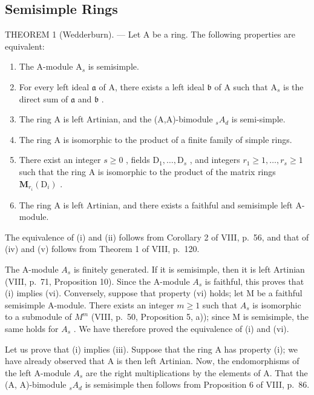 \subsection{Semisimple Rings}

THEOREM 1 (Wedderburn). --- Let A be a ring. The following properties are equivalent:

\begin{enumerate}
\def\labelenumi{(\roman{enumi})}
\item
  The A-module \(\mathrm{A}_s\) is semisimple.
\item
  For every left ideal \(\mathfrak{a}\) of A, there exists a left ideal \(\mathfrak{b}\) of A such that \(\mathrm{A}_s\) is the direct sum of \(\mathfrak{a}\) and \(\mathfrak{b}\) .
\item
  The ring A is left Artinian, and the (A,A)-bimodule \(_{s}A_{d}\) is semi-simple.
\item
  The ring A is isomorphic to the product of a finite family of simple rings.
\item
  There exist an integer \(s \geqslant 0\) , fields \(\mathrm{D}_1, \ldots, \mathrm{D}_s\) , and integers \(r_1 \geqslant 1, \ldots, r_s \geqslant 1\) such that the ring A is isomorphic to the product of the matrix rings \(\mathbf{M}_{r_i}(\mathrm{D}_i)\) .
\item
  The ring A is left Artinian, and there exists a faithful and semisimple left A-module.
\end{enumerate}

The equivalence of (i) and (ii) follows from Corollary 2 of VIII, p.~56, and that of (iv) and (v) follows from Theorem 1 of VIII, p.~120.

The A-module \(A_{s}\) is finitely generated. If it is semisimple, then it is left Artinian (VIII, p.~71, Proposition 10). Since the A-module \(A_{s}\) is faithful, this proves that (i) implies (vi). Conversely, suppose that property (vi) holds; let M be a faithful semisimple A-module. There exists an integer \(m \geqslant 1\) such that \(A_{s}\) is isomorphic to a submodule of \(M^{m}\) (VIII, p.~50, Proposition 5, a)); since M is semisimple, the same holds for \(A_{s}\) . We have therefore proved the equivalence of (i) and (vi).

Let us prove that (i) implies (iii). Suppose that the ring A has property (i); we have already observed that A is then left Artinian. Now, the endomorphisms of the left A-module \(A_{s}\) are the right multiplications by the elements of A. That the (A, A)-bimodule \(_{s}A_{d}\) is semisimple then follows from Proposition 6 of VIII, p.~86.

